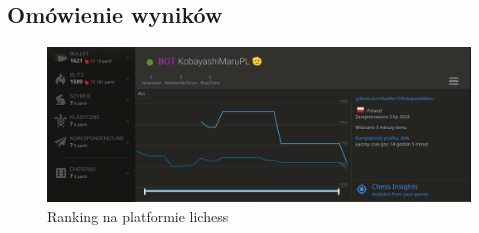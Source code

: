 \subsection{Omówienie wyników}
\label{subsec:omowienie-wynikow}

\begin{figure}[ht]
    \centering
    \includegraphics[width=1\linewidth]{rozdzialy/rozdzial03/2_porownanie-z-innymi-silnikami/rysunki/lichess-ranking}
    \caption{Ranking na platformie lichess}
    \label{fig:lichess-ranking}
\end{figure}
